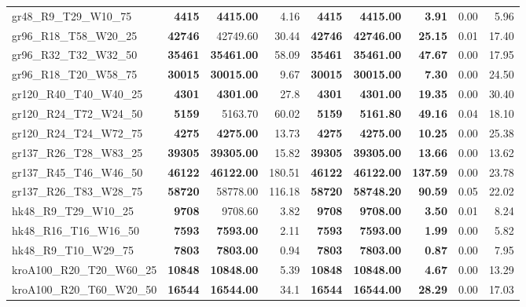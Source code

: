 \documentclass{singlecol-new}
\begin{document}
{\begin{longtable}{lrrrrrrrr}
		gr48\_R9\_T29\_W10\_75 & \textbf{4415} & \textbf{4415.00} & 4.16 & \textbf{4415} & \textbf{4415.00} & \textbf{3.91} & 0.00 & 5.96 \\
		gr96\_R18\_T58\_W20\_25 & \textbf{42746} & 42749.60 & 30.44 & \textbf{42746} & \textbf{42746.00} & \textbf{25.15} & 0.01 & 17.40 \\
		gr96\_R32\_T32\_W32\_50 & \textbf{35461} & \textbf{35461.00} & 58.09 & \textbf{35461} & \textbf{35461.00} & \textbf{47.67} & 0.00 & 17.95 \\
		gr96\_R18\_T20\_W58\_75 & \textbf{30015} & \textbf{30015.00} & 9.67 & \textbf{30015} & \textbf{30015.00} & \textbf{7.30} & 0.00 & 24.50 \\
		gr120\_R40\_T40\_W40\_25 & \textbf{4301} & \textbf{4301.00} & 27.8 & \textbf{4301} & \textbf{4301.00} & \textbf{19.35} & 0.00 & 30.40 \\
		gr120\_R24\_T72\_W24\_50 & \textbf{5159} & 5163.70 & 60.02 & \textbf{5159} & \textbf{5161.80} & \textbf{49.16} & 0.04 & 18.10 \\
		gr120\_R24\_T24\_W72\_75 & \textbf{4275} & \textbf{4275.00} & 13.73 & \textbf{4275} & \textbf{4275.00} & \textbf{10.25} & 0.00 & 25.38 \\
		gr137\_R26\_T28\_W83\_25 & \textbf{39305} & \textbf{39305.00} & 15.82 & \textbf{39305} & \textbf{39305.00} & \textbf{13.66} & 0.00 & 13.62 \\
		gr137\_R45\_T46\_W46\_50 & \textbf{46122} & \textbf{46122.00} & 180.51 & \textbf{46122} & \textbf{46122.00} & \textbf{137.59} & 0.00 & 23.78 \\
		gr137\_R26\_T83\_W28\_75 & \textbf{58720} & 58778.00 & 116.18 & \textbf{58720} & \textbf{58748.20} & \textbf{90.59} & 0.05 & 22.02 \\
		hk48\_R9\_T29\_W10\_25 & \textbf{9708} & 9708.60 & 3.82 & \textbf{9708} & \textbf{9708.00} & \textbf{3.50} & 0.01 & 8.24 \\
		hk48\_R16\_T16\_W16\_50 & \textbf{7593} & \textbf{7593.00} & 2.11 & \textbf{7593} & \textbf{7593.00} & \textbf{1.99} & 0.00 & 5.82 \\
		hk48\_R9\_T10\_W29\_75 & \textbf{7803} & \textbf{7803.00} & 0.94 & \textbf{7803} & \textbf{7803.00} & \textbf{0.87} & 0.00 & 7.95 \\
		kroA100\_R20\_T20\_W60\_25 & \textbf{10848} & \textbf{10848.00} & 5.39 & \textbf{10848} & \textbf{10848.00} & \textbf{4.67} & 0.00 & 13.29 \\
		kroA100\_R20\_T60\_W20\_50 & \textbf{16544} & \textbf{16544.00} & 34.1 & \textbf{16544} & \textbf{16544.00} & \textbf{28.29} & 0.00 & 17.03 \\

\end{longtable}}
\end{document}
